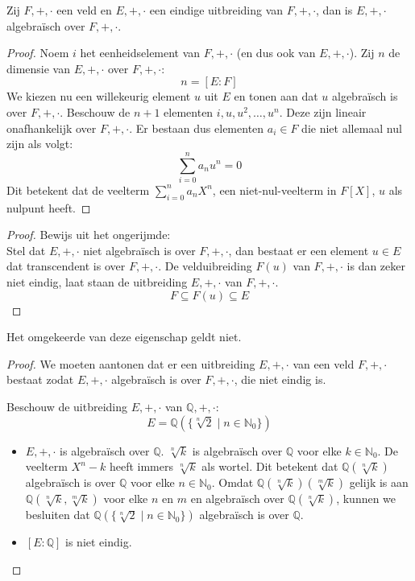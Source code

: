 \documentclass[main.tex]{subfiles}
\begin{document}
\begin{pr}
  \label{st:uitbreiding-eindig-dan-algebraisch}
  Zij $F,+,\cdot$ een veld en $E,+,\cdot$ een eindige uitbreiding van $F,+,\cdot$, dan is $E,+,\cdot$ algebra\"isch over $F,+,\cdot$.

  \begin{proof}
    Noem $i$ het eenheidselement van $F,+,\cdot$ (en dus ook van $E,+,\cdot$).
    Zij $n$ de dimensie van $E,+,\cdot$ over $F,+,\cdot$:
    \[ n = [E:F] \]
    We kiezen nu een willekeurig element $u$ uit $E$ en tonen aan dat $u$ algebra\"isch is over $F,+,\cdot$.
    Beschouw de $n+1$ elementen $i,u,u^{2},\dotsc,u^{n}$.
    Deze zijn lineair onafhankelijk over $F,+,\cdot$.\waarom
    Er bestaan dus elementen $a_{i}\in F$ die niet allemaal nul zijn als volgt:
    \[ \sum_{i=0}^{n}a_{n}u^{n} = 0 \]
    Dit betekent dat de veelterm $\sum_{i=0}^{n}a_{n}X^{n}$, een niet-nul-veelterm in $F[X]$, $u$ als nulpunt heeft.
  \end{proof}
  \begin{proof}
    Bewijs uit het ongerijmde:\\
    Stel dat $E,+,\cdot$ niet algebra\"isch is over $F,+,\cdot$, dan bestaat er een element $u\in E$ dat transcendent is over $F,+,\cdot$.
    De velduibreiding $F(u)$ van $F,+,\cdot$ is dan zeker niet eindig, laat staan de uitbreiding $E,+,\cdot$ van $F,+,\cdot$.
    \[ F \subseteq F(u) \subseteq E \]
  \end{proof}
\end{pr}

\begin{tvb}
  Het omgekeerde van deze eigenschap geldt niet.
  
  \begin{proof}
    We moeten aantonen dat er een uitbreiding $E,+,\cdot$ van een veld $F,+,\cdot$ bestaat zodat $E,+,\cdot$ algebra\"isch is over $F,+,\cdot$, die niet eindig is.

    Beschouw de uitbreiding $E,+,\cdot$ van $\mathbb{Q},+,\cdot$:
    \[ E = \mathbb{Q}(\{\sqrt[n]{2} \mid n\in \mathbb{N}_{0}\}) \]
    \begin{itemize}
    \item $E,+,\cdot$ is algebra\"isch over $\mathbb{Q}$.
      $\sqrt[n]{k}$ is algebra\"isch over $\mathbb{Q}$ voor elke $k\in \mathbb{N}_{0}$.
      De veelterm $X^{n}-k$ heeft immers $\sqrt[n]{k}$ als wortel.
      Dit betekent dat $\mathbb{Q}(\sqrt[n]{k})$ algebra\"isch is over $\mathbb{Q}$ voor elke $n\in \mathbb{N}_{0}$. Omdat $\mathbb{Q}(\sqrt[n]{k})(\sqrt[m]{k})$ gelijk is aan  $\mathbb{Q}(\sqrt[n]{k},\sqrt[m]{k})$ voor elke $n$ en $m$ en algebra\"isch over $\mathbb{Q}(\sqrt[n]{k})$, kunnen we besluiten dat $\mathbb{Q}(\{\sqrt[n]{2} \mid n\in \mathbb{N}_{0}\})$ algebra\"isch is over $\mathbb{Q}$. 
    \item $[E:\mathbb{Q}]$ is niet eindig.
    \end{itemize}
  \end{proof}
\end{tvb}
\end{document}
